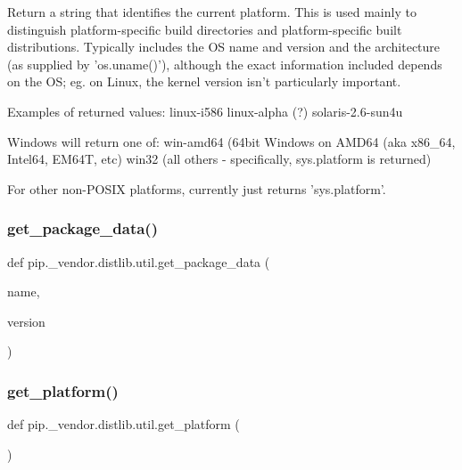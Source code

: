 \begin{DoxyVerb}Return a string that identifies the current platform.  This is used mainly to
distinguish platform-specific build directories and platform-specific built
distributions.  Typically includes the OS name and version and the
architecture (as supplied by 'os.uname()'), although the exact information
included depends on the OS; eg. on Linux, the kernel version isn't
particularly important.

Examples of returned values:
   linux-i586
   linux-alpha (?)
   solaris-2.6-sun4u

Windows will return one of:
   win-amd64 (64bit Windows on AMD64 (aka x86_64, Intel64, EM64T, etc)
   win32 (all others - specifically, sys.platform is returned)

For other non-POSIX platforms, currently just returns 'sys.platform'.\end{DoxyVerb}
 \mbox{\label{namespacepip_1_1__vendor_1_1distlib_1_1util_aa40738b48d620d068b6c7e1ca67b5a87}} 
\subsubsection{\texorpdfstring{get\+\_\+package\+\_\+data()}{get\_package\_data()}}
{\footnotesize\ttfamily def pip.\+\_\+vendor.\+distlib.\+util.\+get\+\_\+package\+\_\+data (\begin{DoxyParamCaption}\item[{}]{name,  }\item[{}]{version }\end{DoxyParamCaption})}

\mbox{\label{namespacepip_1_1__vendor_1_1distlib_1_1util_a0875dfce5a5b4a91a1b7aad7da918a11}} 
\subsubsection{\texorpdfstring{get\+\_\+platform()}{get\_platform()}}
{\footnotesize\ttfamily def pip.\+\_\+vendor.\+distlib.\+util.\+get\+\_\+platform (\begin{DoxyParamCaption}{ }\end{DoxyParamCaption})}

